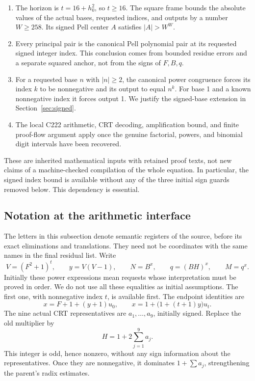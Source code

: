 \documentclass[11pt,letterpaper]{article}
\theoremstyle{remark}\newtheorem{remark}[theorem]{Remark}
\begin{document}
\begin{enumerate}
\item The horizon is \(t=16+h_0^2\), so \(t\ge16\).
The square frame bounds the absolute values of the actual bases, requested
indices, and outputs by a number \(W\ge258\). Its signed Pell center
\(A\) satisfies \(|A|>W^W\).
\item Every principal pair is the canonical Pell polynomial pair at its
requested signed integer index. This conclusion comes from bounded residue
errors and a separate squared anchor, not from the signs of \(F,B,q\).
\item For a requested base \(n\) with \(|n|\ge2\), the canonical power
congruence forces its index \(k\) to be nonnegative and its output to equal
\(n^k\). For base 1 and a known nonnegative index it forces output 1.
We justify the signed-base extension in Section~\ref{sec:signed}.
\item The local C222 arithmetic, CRT decoding, amplification bound, and
finite proof-flow argument apply once the genuine factorial, powers, and
binomial digit intervals have been recovered.
\end{enumerate}

These are inherited mathematical inputs with retained proof texts, not new
claims of a machine-checked compilation of the whole equation. In particular,
the signed index bound is available without any of the three initial sign
guards removed below. This dependency is essential.

\subsection{Notation at the arithmetic interface}

The letters in this subsection denote semantic registers of the source,
before its exact eliminations and translations. They need not be coordinates
with the same names in the final residual list. Write
\[
 V=(F^2+1)^t,\qquad y=V(V-1),\qquad N=B^x,
 \qquad q=(BH)^x,\qquad M=q^x.
\]
Initially these power expressions mean requests whose interpretation must
be proved in order. We do not use all these equalities as initial
assumptions. The first one, with nonnegative index \(t\), is available first.
The endpoint identities are
\begin{equation}\label{eq:endpoints}
 x=F+1+(y+1)u_0,\qquad
 x=1+\bigl(1+(t+1)y\bigr)u_t.
\end{equation}
The nine actual CRT representatives are \(a_1,\ldots,a_9\), initially signed.
Replace the old multiplier by
\begin{equation}\label{eq:oddH}
 H=1+2\sum_{j=1}^9a_j.
\end{equation}
This integer is odd, hence nonzero, without any sign information about the
representatives. Once they are nonnegative, it dominates
\(1+\sum a_j\), strengthening the parent's radix estimates.
\end{document}
